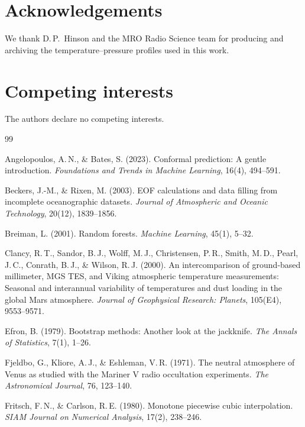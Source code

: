 \documentclass[11pt,a4paper]{article}
\begin{document}
\section*{Acknowledgements}
We thank D.\,P.\ Hinson and the MRO Radio Science team for producing and archiving the temperature--pressure profiles used in this work.

\section*{Competing interests}
The authors declare no competing interests.

\begin{thebibliography}{99}
\setlength{\itemsep}{2pt}\small

Angelopoulos, A.\,N., \& Bates, S. (2023). Conformal prediction: A gentle introduction. \emph{Foundations and Trends in Machine Learning}, 16(4), 494--591.

Beckers, J.-M., \& Rixen, M. (2003). EOF calculations and data filling from incomplete oceanographic datasets. \emph{Journal of Atmospheric and Oceanic Technology}, 20(12), 1839--1856.

Breiman, L. (2001). Random forests. \emph{Machine Learning}, 45(1), 5--32.

Clancy, R.\,T., Sandor, B.\,J., Wolff, M.\,J., Christensen, P.\,R., Smith, M.\,D., Pearl, J.\,C., Conrath, B.\,J., \& Wilson, R.\,J. (2000). An intercomparison of ground-based millimeter, MGS TES, and Viking atmospheric temperature measurements: Seasonal and interannual variability of temperatures and dust loading in the global Mars atmosphere. \emph{Journal of Geophysical Research: Planets}, 105(E4), 9553--9571.

Efron, B. (1979). Bootstrap methods: Another look at the jackknife. \emph{The Annals of Statistics}, 7(1), 1--26.

Fjeldbo, G., Kliore, A.\,J., \& Eshleman, V.\,R. (1971). The neutral atmosphere of Venus as studied with the Mariner V radio occultation experiments. \emph{The Astronomical Journal}, 76, 123--140.

Fritsch, F.\,N., \& Carlson, R.\,E. (1980). Monotone piecewise cubic interpolation. \emph{SIAM Journal on Numerical Analysis}, 17(2), 238--246.


\end{thebibliography}
\end{document}
